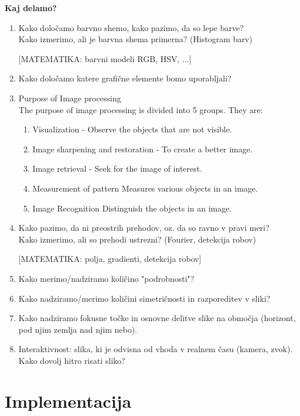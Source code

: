 \noindent \textbf{Kaj delamo?}
\begin{enumerate}
  \item Kako določamo barvno shemo, kako pazimo, da so lepe barve? \\
   Kako izmerimo, ali je barvna shema primerna? (Histogram barv)

   [MATEMATIKA: barvni modeli RGB, HSV, ...]

  \item Kako določamo katere grafične elemente bomo uporabljali?

  \item Purpose of Image processing \\
   The purpose of image processing is divided into 5 groups. They are:
    \begin{enumerate}
      \item Visualization - Observe the objects that are not visible.
      \item Image sharpening and restoration - To create a better image.
      \item Image retrieval - Seek for the image of interest.
      \item Measurement of pattern  Measures various objects in an image.
      \item Image Recognition Distinguish the objects in an image.
    \end{enumerate}
  \item Kako pazimo, da ni preostrih prehodov, oz. da so ravno v pravi meri?\\
   Kako izmerimo, ali so prehodi ustrezni? (Fourier, detekcija robov)

   [MATEMATIKA: polja, gradienti, detekcija robov]

  \item Kako merimo/nadziramo količino "podrobnosti"?

  \item Kako nadziramo/merimo količini simetričnosti in razporeditev v sliki?

  \item Kako nadziramo fokusne točke in osnovne delitve slike na območja (horizont, pod njim zemlja nad njim nebo).

  \item Interaktivnost: slika, ki je odvisna od vhoda v realnem času (kamera, zvok).\\
   Kako dovolj hitro risati sliko?
\end{enumerate}

\chapter{Implementacija}